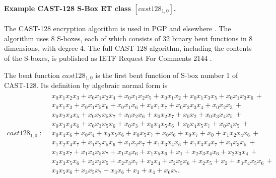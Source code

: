\documentclass[12pt,a4paper]{article}
\begin{document}
\paragraph*{Example CAST-128 S-Box ET class $[cast128_{1,0}]$.}

The CAST-128 encryption algorithm is used in PGP and elsewhere \cite{Ada97}.
The algorithm uses 8 S-boxes, each of which consists of 32 binary bent functions in 8 dimensions,
with degree 4.
The full CAST-128 algorithm, including the contents of the S-boxes,
is published as IETF Request For Comments 2144 \cite{RFC2144}.

The bent function $cast128_{1,0}$ is the first bent function of S-box number 1 of CAST-128.
Its definition by algebraic normal form is
\footnotesize{}
\begin{align*}
cast128_{1,0} :=
\begin{array}{l}
x_{0} x_{1} x_{2} x_{3} + x_{0} x_{1} x_{2} x_{4} + x_{0} x_{1} x_{2} x_{5} + x_{0} x_{1} x_{2} + x_{0} x_{1} x_{3} x_{5} + x_{0} x_{1} x_{3} x_{6}\, +
\\
x_{0} x_{1} x_{3} + x_{0} x_{1} x_{5} x_{6} + x_{0} x_{1} x_{6} + x_{0} x_{1} x_{7} + x_{0} x_{2} x_{3} x_{4} + x_{0} x_{2} x_{3}\, +
\\
x_{0} x_{2} x_{4} x_{5} + x_{0} x_{2} x_{5} x_{7} + x_{0} x_{2} x_{6} + x_{0} x_{2} x_{7} + x_{0} x_{2} + x_{0} x_{3} x_{4} x_{5}\, +
\\
x_{0} x_{3} x_{4} x_{6} + x_{0} x_{3} x_{5} x_{6} + x_{0} x_{3} + x_{0} x_{4} x_{5} x_{6} + x_{0} x_{4} x_{5} x_{7} + x_{0} x_{4} x_{5}\, +
\\
x_{0} x_{4} x_{6} + x_{0} x_{4} + x_{0} x_{5} x_{6} + x_{0} x_{5} x_{7} + x_{0} x_{6} + x_{0} x_{7} + x_{0} + x_{1} x_{2} x_{4} x_{6}\, +
\\
x_{1} x_{2} x_{4} x_{7} + x_{1} x_{2} x_{5} x_{6} + x_{1} x_{2} x_{7} + x_{1} x_{3} x_{4} x_{6} + x_{1} x_{3} x_{4} x_{7} + x_{1} x_{3} x_{5}\, +
\\
x_{1} x_{3} x_{7} + x_{1} x_{4} x_{5} x_{7} + x_{1} x_{4} x_{6} + x_{1} x_{5} x_{6} + x_{1} + x_{2} x_{3} x_{4} x_{6} + x_{2} x_{3} x_{4}\, +
\\
x_{2} x_{3} x_{5} x_{6} + x_{2} x_{3} x_{5} + x_{2} x_{3} x_{7} + x_{2} x_{4} + x_{2} x_{5} x_{6} + x_{2} x_{5} + x_{2} + x_{3} x_{4} x_{5} x_{6}\, +
\\
x_{3} x_{5} x_{6} + x_{3} x_{5} x_{7} + x_{3} x_{6} + x_{3} + x_{4} + x_{6} x_{7}.
\end{array}
\end{align*}
\normalsize{}
\end{document}
